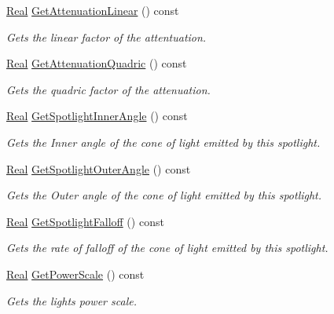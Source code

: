 \begin{DoxyCompactItemize}
\hyperlink{namespacephys_af7eb897198d265b8e868f45240230d5f}{Real} \hyperlink{classphys_1_1Light_a92245ddc5383fd7f0989866852e36ed8}{GetAttenuationLinear} () const 
\begin{DoxyCompactList}\small\item\em Gets the linear factor of the attentuation. \item\end{DoxyCompactList}\item 
\hyperlink{namespacephys_af7eb897198d265b8e868f45240230d5f}{Real} \hyperlink{classphys_1_1Light_a4ea9693e7ba3f4b6199f132b29e645fa}{GetAttenuationQuadric} () const 
\begin{DoxyCompactList}\small\item\em Gets the quadric factor of the attenuation. \item\end{DoxyCompactList}\item 
\hyperlink{namespacephys_af7eb897198d265b8e868f45240230d5f}{Real} \hyperlink{classphys_1_1Light_a429728b3eb1287806c70a24666705213}{GetSpotlightInnerAngle} () const 
\begin{DoxyCompactList}\small\item\em Gets the Inner angle of the cone of light emitted by this spotlight. \item\end{DoxyCompactList}\item 
\hyperlink{namespacephys_af7eb897198d265b8e868f45240230d5f}{Real} \hyperlink{classphys_1_1Light_a669ab7936e718263d02343ef03333bad}{GetSpotlightOuterAngle} () const 
\begin{DoxyCompactList}\small\item\em Gets the Outer angle of the cone of light emitted by this spotlight. \item\end{DoxyCompactList}\item 
\hyperlink{namespacephys_af7eb897198d265b8e868f45240230d5f}{Real} \hyperlink{classphys_1_1Light_a7682e55d5210c2433060dd9e4f4669ba}{GetSpotlightFalloff} () const 
\begin{DoxyCompactList}\small\item\em Gets the rate of falloff of the cone of light emitted by this spotlight. \item\end{DoxyCompactList}\item 
\hyperlink{namespacephys_af7eb897198d265b8e868f45240230d5f}{Real} \hyperlink{classphys_1_1Light_add09593ac1e57a946aa5f0c319dd56ae}{GetPowerScale} () const 
\begin{DoxyCompactList}\small\item\em Gets the lights power scale. \item\end{DoxyCompactList}\end{DoxyCompactItemize}
